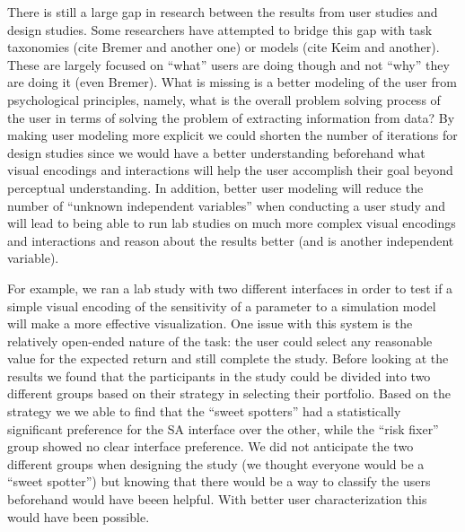 There is still a large gap in research between the results from user studies
and design studies. Some researchers have attempted to bridge this gap with
task taxonomies (cite Bremer and another one) or models (cite Keim and
another). These are largely focused on ``what'' users are doing though and not
``why'' they are doing it (even Bremer). What is missing is a better modeling
of the user from psychological principles, namely, what is the overall problem
solving process of the user in terms of solving the problem of extracting
information from data? By making user modeling more explicit we could shorten
the number of iterations for design studies since we would have a better
understanding beforehand what visual encodings and interactions will help the
user accomplish their goal beyond perceptual understanding. In addition, better
user modeling will reduce the number of ``unknown independent variables'' when
conducting a user study and will lead to being able to run lab studies on much
more complex visual encodings and interactions and reason about the results
better (and is another independent variable).

For example, we ran a lab study with two different interfaces in order
to test if a simple visual encoding of the sensitivity of a parameter to
a simulation model will make a more effective visualization. One issue
with this system is the relatively open-ended nature of the task: the
user could select any reasonable value for the expected return and still
complete the study. Before looking at the results we found that the
participants in the study could be divided into two different groups
based on their strategy in selecting their portfolio. Based on the
strategy we we able to find that the ``sweet spotters'' had a
statistically significant preference for the SA interface over the
other, while the ``risk fixer'' group showed no clear interface
preference. We did not anticipate the two different groups when
designing the study (we thought everyone would be a ``sweet spotter'')
but knowing that there would be a way to classify the users beforehand
would have beeen helpful. With better user characterization this would
have been possible.

